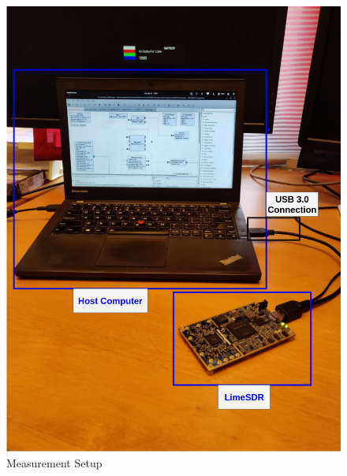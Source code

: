 \begin{figure}[h!]
\centering
\includegraphics[scale=0.2]{Thesis/Figure/MeasurementSetup.png}
\caption{Measurement Setup}
\label{Real_Setup}
\end{figure}

